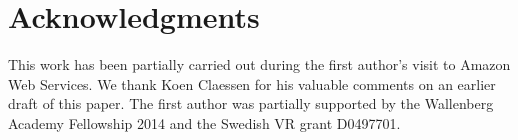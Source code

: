 \section*{Acknowledgments}
\label{sect:aws/acks}
This work has been partially carried out during the first author's visit to Amazon Web Services. We thank Koen Claessen for his valuable comments on an earlier draft of this paper. The first author was partially supported by the Wallenberg Academy Fellowship 2014 and the Swedish VR grant D0497701.
